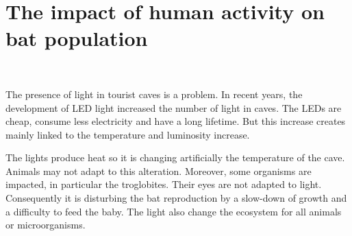 \documentclass[draft, final]{report}
\begin{document}
\section{The impact of human activity on bat population}
~\par
The presence of light in tourist caves is a problem. In recent years, the development of LED light increased the number of light in caves. The LEDs are cheap, consume less electricity and have a long lifetime. But this increase creates mainly linked to the temperature and luminosity increase. \\
\par
The lights produce heat so it is changing artificially the temperature of the cave. Animals may not adapt to this alteration.
Moreover, some organisms are impacted, in particular the troglobites. Their eyes are not adapted to light. Consequently it is disturbing the bat reproduction by a slow-down of growth and a difficulty to feed the baby. The light also change the ecosystem for all animals or microorganisms.\\
\par
\end{document}
